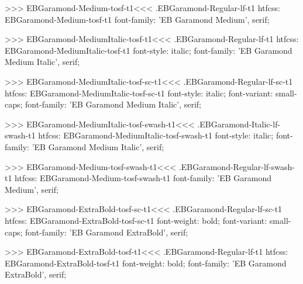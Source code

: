 {{{{{{{>>>
\<EBGaramond-Medium-tosf-t1\><<<
.EBGaramond-Regular-lf-t1
htfcss:  EBGaramond-Medium-tosf-t1  font-family: 'EB Garamond Medium', serif;

>>>
\<EBGaramond-MediumItalic-tosf-t1\><<<
.EBGaramond-Regular-lf-t1
htfcss:  EBGaramond-MediumItalic-tosf-t1  font-style: italic; font-family: 'EB Garamond Medium Italic', serif;

>>>
\<EBGaramond-MediumItalic-tosf-sc-t1\><<<
.EBGaramond-Regular-lf-sc-t1
htfcss:  EBGaramond-MediumItalic-tosf-sc-t1  font-style: italic; font-variant: small-caps; font-family: 'EB Garamond Medium Italic', serif;

>>>
\<EBGaramond-MediumItalic-tosf-swash-t1\><<<
.EBGaramond-Italic-lf-swash-t1
htfcss:  EBGaramond-MediumItalic-tosf-swash-t1  font-style: italic; font-family: 'EB Garamond Medium Italic', serif;

>>>
\<EBGaramond-Medium-tosf-swash-t1\><<<
.EBGaramond-Regular-lf-swash-t1
htfcss:  EBGaramond-Medium-tosf-swash-t1  font-family: 'EB Garamond Medium', serif;

>>>
\<EBGaramond-ExtraBold-tosf-sc-t1\><<<
.EBGaramond-Regular-lf-sc-t1
htfcss:  EBGaramond-ExtraBold-tosf-sc-t1  font-weight: bold; font-variant: small-caps; font-family: 'EB Garamond ExtraBold', serif;

>>>
\<EBGaramond-ExtraBold-tosf-t1\><<<
.EBGaramond-Regular-lf-t1
htfcss:  EBGaramond-ExtraBold-tosf-t1  font-weight: bold; font-family: 'EB Garamond ExtraBold', serif;

}}}}}}}
